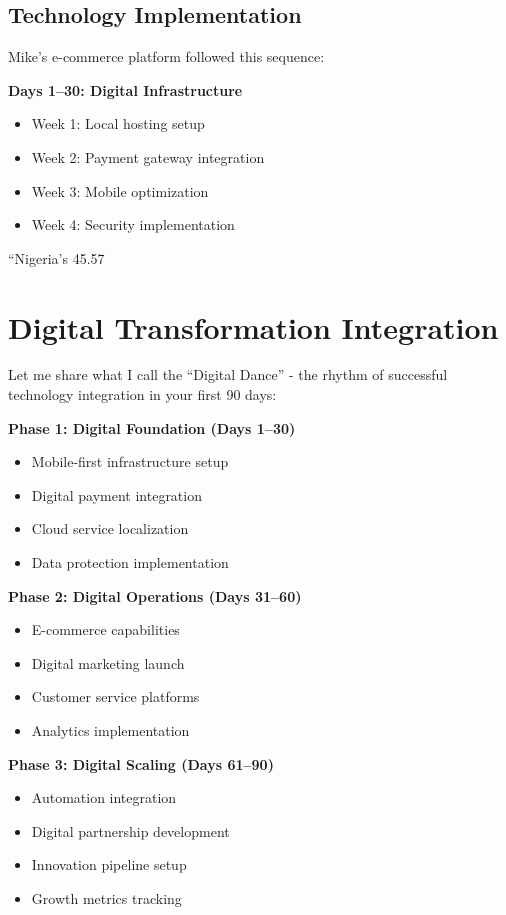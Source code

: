 \subsection{Technology Implementation}\label{subsec:us-implementation}
Mike's e-commerce platform followed this sequence:

\textbf{Days 1--30: Digital Infrastructure}
\begin{itemize}
    \item Week 1: Local hosting setup
    \item Week 2: Payment gateway integration
    \item Week 3: Mobile optimization
    \item Week 4: Security implementation
\end{itemize}

``Nigeria's 45.57%

\section{Digital Transformation Integration}\label{sec:digital-transformation}

Let me share what I call the ``Digital Dance'' - the rhythm of successful technology integration in your first 90 days:

\textbf{Phase 1: Digital Foundation (Days 1--30)}
\begin{itemize}
    \item Mobile-first infrastructure setup
    \item Digital payment integration
    \item Cloud service localization
    \item Data protection implementation
\end{itemize}

\textbf{Phase 2: Digital Operations (Days 31--60)}
\begin{itemize}
    \item E-commerce capabilities
    \item Digital marketing launch
    \item Customer service platforms
    \item Analytics implementation
\end{itemize}

\textbf{Phase 3: Digital Scaling (Days 61--90)}
\begin{itemize}
    \item Automation integration
    \item Digital partnership development
    \item Innovation pipeline setup
    \item Growth metrics tracking
\end{itemize}

